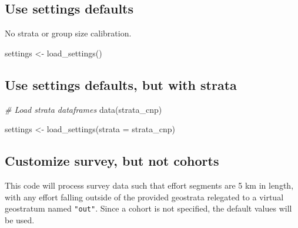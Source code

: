 \documentclass[
]{book}
\newenvironment{Shaded}{\begin{snugshade}}{\end{snugshade}}
\newcommand{\AttributeTok}[1]{\textcolor[rgb]{0.77,0.63,0.00}{#1}}
\newcommand{\CommentTok}[1]{\textcolor[rgb]{0.56,0.35,0.01}{\textit{#1}}}
\newcommand{\FunctionTok}[1]{\textcolor[rgb]{0.00,0.00,0.00}{#1}}
\newcommand{\NormalTok}[1]{#1}
\newcommand{\OtherTok}[1]{\textcolor[rgb]{0.56,0.35,0.01}{#1}}
\begin{document}
\hypertarget{use-settings-defaults}{%
\subsection*{Use settings defaults}\label{use-settings-defaults}}

No strata or group size calibration.

\begin{Shaded}
\begin{Highlighting}[]
\NormalTok{settings }\OtherTok{\textless{}{-}} \FunctionTok{load\_settings}\NormalTok{()}
\end{Highlighting}
\end{Shaded}

\hypertarget{use-settings-defaults-but-with-strata}{%
\subsection*{Use settings defaults, but with strata}\label{use-settings-defaults-but-with-strata}}

\begin{Shaded}
\begin{Highlighting}[]
\CommentTok{\# Load strata dataframes}
\FunctionTok{data}\NormalTok{(strata\_cnp)}

\NormalTok{settings }\OtherTok{\textless{}{-}} \FunctionTok{load\_settings}\NormalTok{(}\AttributeTok{strata =}\NormalTok{ strata\_cnp)}
\end{Highlighting}
\end{Shaded}

\hypertarget{customize-survey-but-not-cohorts}{%
\subsection*{Customize survey, but not cohorts}\label{customize-survey-but-not-cohorts}}

This code will process survey data such that effort segments are 5 km in length, with any effort falling outside of the provided geostrata relegated to a virtual geostratum named \texttt{"out"}. Since a cohort is not specified, the default values will be used.
\end{document}
